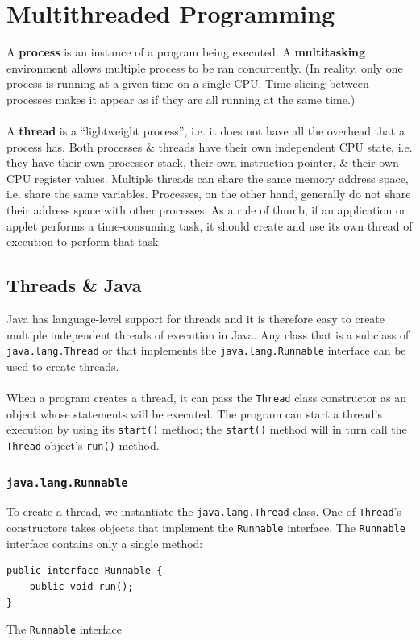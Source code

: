 \documentclass[a4paper,11pt]{article}
\newenvironment{code}{\captionsetup{type=listing}}{}
\begin{document}
\section{Multithreaded Programming}
A \textbf{process} is an instance of a program being executed.
A \textbf{multitasking} environment allows multiple process to be ran concurrently. 
(In reality, only one process is running at a given time on a single CPU.
Time slicing between processes makes it appear as if they are all running at the same time.)
\\\\
A \textbf{thread} is a ``lightweight process'', i.e. it does not have all the overhead that a process has.
Both processes \& threads have their own independent CPU state, i.e. they have their own processor stack,
their own instruction pointer, \& their own CPU register values.
Multiple threads can share the same memory address space, i.e. share the same variables.
Processes, on the other hand, generally do not share their address space with other processes.
As a rule of thumb, if an application or applet performs a time-consuming task, it should create and use its own thread of execution 
to perform that task.

\subsection{Threads \& Java}
Java has language-level support for threads and it is therefore easy to create multiple independent threads 
of execution in Java.
Any class that is a subclass of \texttt{java.lang.Thread} or that implements the 
\texttt{java.lang.Runnable} interface can be used to create threads.
\\\\
When a program creates a thread, it can pass the \texttt{Thread} class constructor as an object whose 
statements will be executed.
The program can start a thread's execution by using its \texttt{start()} method; the 
\texttt{start()} method will in turn call the \texttt{Thread} object's
\texttt{run()} method.


\subsubsection{\texttt{java.lang.Runnable}}
To create a thread, we instantiate the \texttt{java.lang.Thread} class. 
One of \texttt{Thread}'s constructors takes objects that implement the \texttt{Runnable}
interface. 
The \texttt{Runnable} interface contains only a single method:
\begin{code}
\begin{verbatim}
public interface Runnable {
    public void run();
}
\end{verbatim}
\caption{The \texttt{Runnable} interface}
\end{code}
\end{document}
